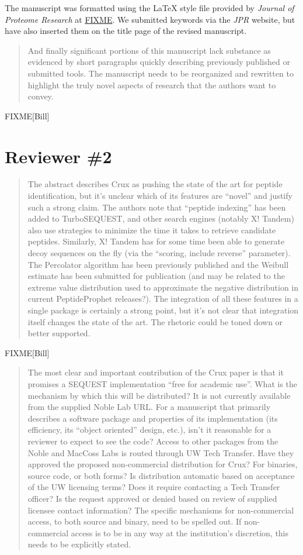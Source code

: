 \documentclass{article}
\newcommand{\breview}{\begin{quotation}\begin{em}\noindent}
\newcommand{\ereview}{\end{em}\end{quotation}}
\begin{document}
The manuscript was formatted using the LaTeX style file provided by
{\em Journal of Proteome Research} at \url{FIXME}.  We submitted
keywords via the {\em JPR} website, but have also inserted them on the
title page of the revised manuscript.

\breview And finally significant portions of this manuscript lack
substance as evidenced by short paragraphs quickly describing
previously published or submitted tools.  The manuscript needs to be
reorganized and rewritten to highlight the truly novel aspects of
research that the authors want to convey. \ereview

FIXME[Bill]

\section*{Reviewer \#2}

\breview The abstract describes Crux as pushing the state of the art
for peptide identification, but it's unclear which of its features are
``novel'' and justify such a strong claim. The authors note that
``peptide indexing'' has been added to TurboSEQUEST, and other search
engines (notably X! Tandem) also use strategies to minimize the time
it takes to retrieve candidate peptides. Similarly, X! Tandem has for
some time been able to generate decoy sequences on the fly (via the
``scoring, include reverse'' parameter). The Percolator algorithm has
been previously published and the Weibull estimate has been submitted
for publication (and may be related to the extreme value distribution
used to approximate the negative distribution in current
PeptideProphet releases?). The integration of all these features in a
single package is certainly a strong point, but it's not clear that
integration itself changes the state of the art. The rhetoric could be
toned down or better supported. \ereview

FIXME[Bill]

\breview The most clear and important contribution of the Crux paper
is that it promises a SEQUEST implementation ``free for academic
use''. What is the mechanism by which this will be distributed? It is
not currently available from the supplied Noble Lab URL. For a
manuscript that primarily describes a software package and properties
of its implementation (its efficiency, its ``object oriented'' design,
etc.), isn't it reasonable for a reviewer to expect to see the code?
Access to other packages from the Noble and MacCoss Labs is routed
through UW Tech Transfer. Have they approved the proposed
non-commercial distribution for Crux? For binaries, source code, or
both forms? Is distribution automatic based on acceptance of the UW
licensing terms? Does it require contacting a Tech Transfer officer?
Is the request approved or denied based on review of supplied licensee
contact information? The specific mechanisms for non-commercial
access, to both source and binary, need to be spelled out. If
non-commercial access is to be in any way at the institution's
discretion, this needs to be explicitly stated. \ereview
\end{document}
